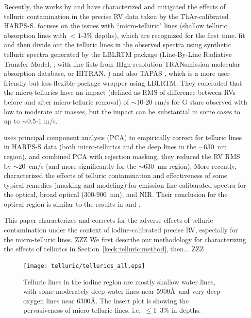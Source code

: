 Recently, the works by \cite{artigau2014} and \cite{cunha2014} have
characterized and mitigated the effects of telluric contamination in
the precise RV data taken by the ThAr-calibrated HARPS-S.
\cite{cunha2014} focuses on the issues with ``micro-telluric" lines
(shallow telluric absorption lines with $<1$-3\% depths), which are
recognized for the first time. \cite{cunha2014} fit and then divide
out the telluric lines in the observed spectra using synthetic
telluric spectra generated by the LBLRTM package (Line-By-Line
Radiative Transfer Model, \citealt{lblrtm}; with line lists from
HIgh-resolution TRANsmission molecular absorption database, or HITRAN,
\citealt{hitran2013}) and also TAPAS \citep{tapas}, which is a more
user-friendly but less flexible package wrapper using LBLRTM. They
concluded that the micro-tellurics have an impact (defined as RMS of
difference between RVs before and after micro-telluric removal) of
$\sim$10-20 cm/s for G stars observed with low to moderate air masses,
but the impact can be substantial in some cases to up to $\sim$0.5-1
m/s.

\cite{artigau2014} uses principal component analysis (PCA) to
empirically correct for telluric lines in HARPS-S data (both
micro-tellurics and the deep lines in the $\sim$630~nm region), and
combined PCA with rejection masking, they reduced the RV RMS by
$\sim$20~cm/s (and more significantly for the $\sim$630~nm
region). More recently, \cite{2016AAS...22713719S} characterized the
effects of telluric contamination and effectiveness of some typical
remedies (masking and modeling) for emission line-calibarated spectra
for the optical, broad optical (300-900~nm), and NIR. Their conclusion
for the optical region is similar to the results in \cite{artigau2014}
and \cite{cunha2014}.

This paper characterizes and corrects for the adverse effects of
telluric contamination under the context of iodine-calibrated precise
RV, especially for the micro-telluric lines. ZZZ We first describe our
methodology for characterizing the effects of tellurics in
Section~\ref{keck:telluric:method}, then... ZZZ


\begin{figure}
\texttt{[image: telluric/tellurics\_all.eps]} 
\caption{Telluric lines in the iodine region are mostly shallow water
lines, with some moderately deep water lines near 5900\AA\ and very
deep oxygen lines near 6300\AA. The insert plot is showing the
pervasiveness of micro-telluric lines, i.e.~$\leq$1--3\% in depths.
\label{telluric:fig:telluric}}
\end{figure}



